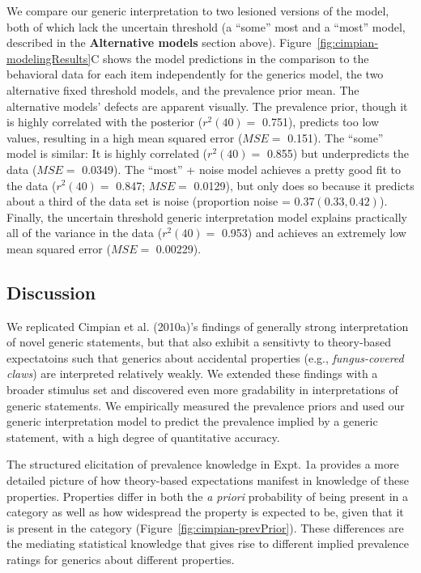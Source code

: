 \documentclass[,man,floatsintext]{apa6}
\theoremstyle{definition}
\theoremstyle{definition}
\theoremstyle{definition}
\theoremstyle{remark}
\begin{document}
We compare our generic interpretation to two lesioned versions of the
model, both of which lack the uncertain threshold (a \enquote{some} most
and a \enquote{most} model, described in the \textbf{Alternative models}
section above). Figure~\ref{fig:cimpian-modelingResults}C shows the
model predictions in the comparison to the behavioral data for each item
independently for the generics model, the two alternative fixed
threshold models, and the prevalence prior mean. The alternative models'
defects are apparent visually. The prevalence prior, though it is highly
correlated with the posterior (\(r^2(40)=\) 0.751), predicts too low
values, resulting in a high mean squared error (\(MSE=\) 0.151). The
\enquote{some} model is similar: It is highly correlated (\(r^2(40)=\)
0.855) but underpredicts the data (\(MSE=\) 0.0349). The \enquote{most}
+ noise model achieves a pretty good fit to the data (\(r^2(40) =\)
0.847; \(MSE=\) 0.0129), but only does so because it predicts about a
third of the data set is noise (proportion noise =
\(0.37 (0.33, 0.42)\)). Finally, the uncertain threshold generic
interpretation model explains practically all of the variance in the
data (\(r^2(40) =\) 0.953) and achieves an extremely low mean squared
error (\(MSE =\) 0.00229).

\hypertarget{discussion}{%
\subsection{Discussion}\label{discussion}}

We replicated Cimpian et al. (2010a)'s findings of generally strong
interpretation of novel generic statements, but that also exhibit a
sensitivty to theory-based expectatoins such that generics about
accidental properties (e.g., \emph{fungus-covered claws}) are
interpreted relatively weakly. We extended these findings with a broader
stimulus set and discovered even more gradability in interpretations of
generic statements. We empirically measured the prevalence priors and
used our generic interpretation model to predict the prevalence implied
by a generic statement, with a high degree of quantitative accuracy.

The structured elicitation of prevalence knowledge in Expt. 1a provides
a more detailed picture of how theory-based expectations manifest in
knowledge of these properties. Properties differ in both the \emph{a
priori} probability of being present in a category as well as how
widespread the property is expected to be, given that it is present in
the category (Figure~\ref{fig:cimpian-prevPrior}). These differences are
the mediating statistical knowledge that gives rise to different implied
prevalence ratings for generics about different properties.
\end{document}
